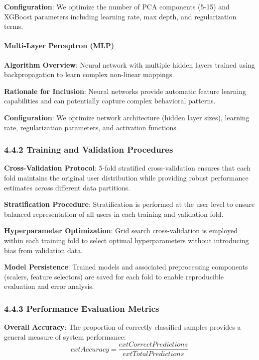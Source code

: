 \documentclass[
  11pt,
  a4paper,
]{article}
\begin{document}
\textbf{Configuration}: We optimize the number of PCA components (5-15)
and XGBoost parameters including learning rate, max depth, and
regularization terms.

\paragraph{Multi-Layer Perceptron
(MLP)}\label{multi-layer-perceptron-mlp}

\textbf{Algorithm Overview}: Neural network with multiple hidden layers
trained using backpropagation to learn complex non-linear mappings.

\textbf{Rationale for Inclusion}: Neural networks provide automatic
feature learning capabilities and can potentially capture complex
behavioral patterns.

\textbf{Configuration}: We optimize network architecture (hidden layer
sizes), learning rate, regularization parameters, and activation
functions.

\subsubsection{4.4.2 Training and Validation
Procedures}\label{training-and-validation-procedures}

\textbf{Cross-Validation Protocol}: 5-fold stratified cross-validation
ensures that each fold maintains the original user distribution while
providing robust performance estimates across different data partitions.

\textbf{Stratification Procedure}: Stratification is performed at the
user level to ensure balanced representation of all users in each
training and validation fold.

\textbf{Hyperparameter Optimization}: Grid search cross-validation is
employed within each training fold to select optimal hyperparameters
without introducing bias from validation data.

\textbf{Model Persistence}: Trained models and associated preprocessing
components (scalers, feature selectors) are saved for each fold to
enable reproducible evaluation and error analysis.

\subsubsection{4.4.3 Performance Evaluation
Metrics}\label{performance-evaluation-metrics}

\textbf{Overall Accuracy}: The proportion of correctly classified
samples provides a general measure of system performance:
\[ ext{Accuracy} = \frac{ ext{Correct Predictions}}{ ext{Total Predictions}}\]
\end{document}
